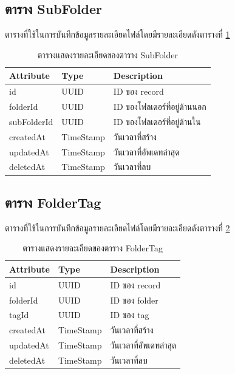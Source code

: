 \documentclass[12pt,oneside,openright,a4paper]{cpe-thai-project}
\begin{document}
\subsection{ตาราง SubFolder}
ตารางที่ใช้ในการบันทึกข้อมูลรายละเอียดไฟล์โดยมีรายละเอียดดังตารางที่ \ref{tbl:dbSubFolder}
\begin{table}[!ht]
    \centering
    \begin{tabular}{|p{4cm}|p{2cm}|p{6cm}|}
    \hline
    \textbf{Attribute} & \textbf{Type} & \textbf{Description}   \\ \hline
    id          & UUID      & ID ของ record                \\ \hline
    folderId    & UUID      & ID ของโฟลเดอร์ที่อยู่ด้านนอก \\ \hline
    subFolderId & UUID      & ID ของโฟลเดอร์ที่อยู่ด้านใน  \\ \hline
    createdAt   & TimeStamp & วันเวลาที่สร้าง              \\ \hline
    updatedAt   & TimeStamp & วันเวลาที่อัพเดทล่าสุด       \\ \hline
    deletedAt   & TimeStamp & วันเวลาที่ลบ                \\ \hline  
    \end{tabular}
    \caption{\centering  ตารางแสดงรายละเอียดของตาราง SubFolder} \label{tbl:dbSubFolder}
\end{table}

\newpage
\subsection{ตาราง FolderTag}
ตารางที่ใช้ในการบันทึกข้อมูลรายละเอียดไฟล์โดยมีรายละเอียดดังตารางที่ \ref{tbl:dbFolderTag}
\begin{table}[!ht]
    \centering
    \begin{tabular}{|p{4cm}|p{2cm}|p{6cm}|}
    \hline
    \textbf{Attribute} & \textbf{Type} & \textbf{Description}   \\ \hline
    id        & UUID      & ID ของ record          \\ \hline
    folderId  & UUID      & ID ของ folder          \\ \hline
    tagId     & UUID      & ID ของ tag             \\ \hline
    createdAt & TimeStamp & วันเวลาที่สร้าง        \\ \hline
    updatedAt & TimeStamp & วันเวลาที่อัพเดทล่าสุด \\ \hline
    deletedAt & TimeStamp & วันเวลาที่ลบ     \\ \hline
    \end{tabular}
    \caption{\centering  ตารางแสดงรายละเอียดของตาราง FolderTag} \label{tbl:dbFolderTag}
\end{table}
\end{document}
